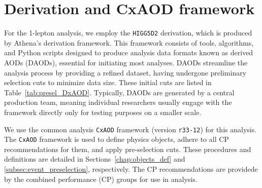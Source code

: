\section{Derivation and CxAOD framework}
\label{subsec:DxAOD_and_CxAOD}
For the 1-lepton analysis, we employ the \texttt{HIGG5D2} derivation, which is produced by Athena's derivation framework. This framework consists of tools, algorithms, and Python scripts designed to produce analysis data formats known as derived AODs (DAODs), essential for initiating most analyses. 
DAODs streamline the analysis process by providing a refined dataset, having undergone preliminary selection cuts to minimize data size. These initial cuts are listed in Table~\ref{tab:presel_DxAOD}. Typically, DAODs are generated by a central production team, meaning individual researchers usually engage with the framework directly only for testing purposes on a smaller scale.

\begin{table}[t]
\caption{Pre-selections in the derivation framework for data size reduction. 
$N_j$, $N_J^{\textrm{TCC}}$, and $N_J^{\textrm{LCTopo}}$ represent the counts of different types of jets.} 
\label{tab:presel_DxAOD}
\begin{center}
\end{center}
\end{table}

We use the common analysis \texttt{CxAOD} framework (version \texttt{r33-12}) for this analysis.
The \texttt{CxAOD} framework is used to define physics objects, adhere to all CP recommendations for them, and apply pre-selection cuts.
These procedures and definitions are detailed in Sections~\ref{chap:objects_def} and \ref{subsec:event_preselection}, respectively.
The CP recommendations are providede by the combined performance (CP) groups for use in analysis.
